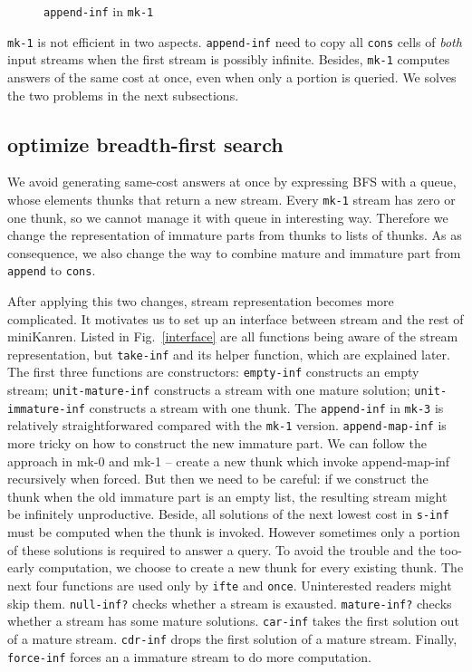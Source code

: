 \documentclass[format=acmlarge, review=true, authordraft=true]{acmart}
\begin{document}
\begin{figure}
	 	
	 \caption{\texttt{append-inf} in \texttt{mk-1}}
	 \label{append-inf-1}
\end{figure}

\texttt{mk-1} is not efficient in two aspects. \texttt{append-inf} need to copy 
all \texttt{cons} cells of \emph{both} input streams when the first stream is 
possibly infinite. Besides, \texttt{mk-1} computes answers of the same cost
at once, even when only a portion is queried. We solves the two problems in the 
next subsections.

\subsection{optimize breadth-first search}

We avoid generating same-cost answers at once by expressing BFS with a queue, 
whose elements thunks that return a new stream. Every \texttt{mk-1} stream has 
zero or one thunk, so we cannot manage it with queue in interesting 
way. Therefore we change the representation of immature parts from thunks to 
lists of thunks. As as consequence, we also change the way to combine mature and 
immature part from \texttt{append} to \texttt{cons}. 

After applying this two changes, stream representation becomes more 
complicated. It motivates us to set up an interface between stream 
and the rest of miniKanren. Listed in Fig.~\ref{interface} are all functions 
being aware of the stream representation, but \texttt{take-inf} and its helper 
function, which are explained later. The first three functions are 
constructors: 
\texttt{empty-inf} constructs an empty stream; \texttt{unit-mature-inf} 
constructs a stream with one mature solution; \texttt{unit-immature-inf} 
constructs a stream with one thunk. The \texttt{append-inf} in \texttt{mk-3} is 
relatively straightforwared compared with the \texttt{mk-1} version. 
\texttt{append-map-inf} is more tricky on how to construct the new immature 
part. We can follow the approach in mk-0 and mk-1 -- create a new thunk which 
invoke append-map-inf recursively when forced. But then we need to be careful: 
if we construct the thunk when the old immature part is an empty list, the 
resulting stream might be infinitely unproductive. Beside, all solutions of the 
next lowest cost in \texttt{s-inf} must be computed when the thunk is invoked. 
However sometimes only a portion of these solutions is required to answer a 
query. To avoid the trouble and the too-early computation, we choose to create 
a new thunk for every existing thunk. The next four functions are used only by 
\texttt{ifte} and \texttt{once}. Uninterested readers might skip them. 
\texttt{null-inf?} checks whether a stream is exausted. \texttt{mature-inf?} 
checks whether a stream has some mature solutions. \texttt{car-inf} takes the 
first solution out of a mature stream. \texttt{cdr-inf} drops the first 
solution of a mature stream. Finally, \texttt{force-inf} forces an a immature 
stream to do more computation.
\end{document}
